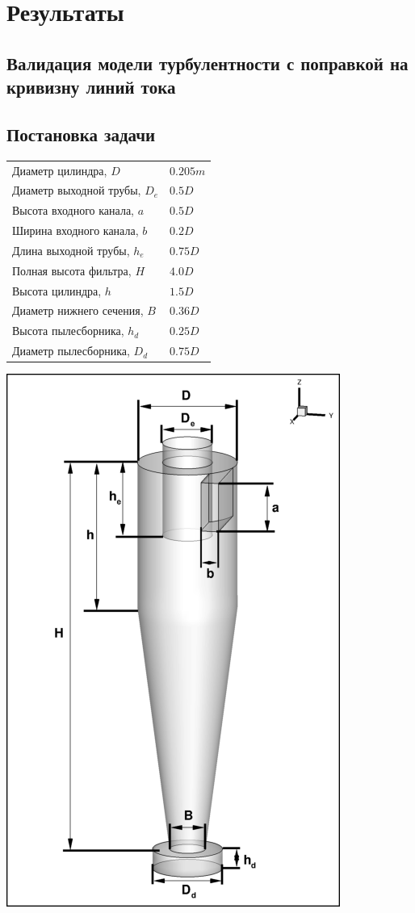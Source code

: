\section{Результаты}
\subsection{Валидация модели турбулентности с поправкой на кривизну линий тока}
\label{UDUCTComparison}
\newpage
\subsection{Постановка задачи}
  \begin{minipage}{0.6\textwidth}
			\begin{tabular}{l l}
				\hline
				\label{geometrytable}
				Диаметр цилиндра, $D$ & $0.205m$ \\
				Диаметр выходной трубы, $D_e$ & $0.5D$ \\
				Высота входного канала, $a$ & $0.5D$ \\
				Ширина входного канала, $b$ & $0.2D$ \\
				Длина выходной трубы, $h_e$ & $0.75D$ \\
				Полная высота фильтра, $H$ & $4.0D$ \\
				Высота цилиндра, $h$ & $1.5D$ \\
				Диаметр нижнего сечения, $B$ & $0.36D$ \\
				Высота пылесборника, $h_d$ & $0.25D$ \\
				Диаметр пылесборника, $D_d$ & $0.75D$ \\
			\end{tabular}
    \end{minipage}
    \hspace{1em}
  \begin{minipage}{0.35\textwidth}
    \includegraphics[scale=0.375]{Geometry}
  \end{minipage}
